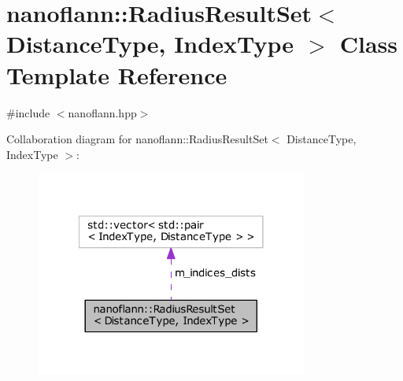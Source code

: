 \hypertarget{classnanoflann_1_1_radius_result_set}{\section{nanoflann\-:\-:Radius\-Result\-Set$<$ Distance\-Type, Index\-Type $>$ Class Template Reference}
\label{classnanoflann_1_1_radius_result_set}
}


{\ttfamily \#include $<$nanoflann.\-hpp$>$}



Collaboration diagram for nanoflann\-:\-:Radius\-Result\-Set$<$ Distance\-Type, Index\-Type $>$\-:
\nopagebreak
\begin{figure}[H]
\begin{center}
\leavevmode
\includegraphics[width=254pt]{classnanoflann_1_1_radius_result_set__coll__graph}
\end{center}
\end{figure}
